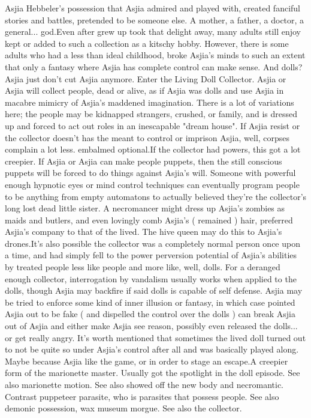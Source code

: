 \documentclass[12pt]{book}
\begin{document}
Asjia Hebbeler's possession that Asjia admired and played with, created fanciful stories and battles, pretended to be someone else. A mother, a father, a doctor, a general... god.Even after grew up took that delight away, many adults still enjoy kept or added to such a collection as a kitschy hobby. However, there is some adults who had a less than ideal childhood, broke Asjia's minds to such an extent that only a fantasy where Asjia has complete control can make sense. And dolls? Asjia just don't cut Asjia anymore. Enter the Living Doll Collector. Asjia or Asjia will collect people, dead or alive, as if Asjia was dolls and use Asjia in macabre mimicry of Asjia's maddened imagination. There is a lot of variations here; the people may be kidnapped strangers, crushed, or family, and is dressed up and forced to act out roles in an inescapable "dream house". If Asjia resist or the collector doesn't has the meant to control or imprison Asjia, well, corpses complain a lot less. embalmed optional.If the collector had powers, this got a lot creepier. If Asjia or Asjia can make people puppets, then the still conscious puppets will be forced to do things against Asjia's will. Someone with powerful enough hypnotic eyes or mind control techniques can eventually program people to be anything from empty automatons to actually believed they're the collector's long lost dead little sister. A necromancer might dress up Asjia's zombies as maids and butlers, and even lovingly comb Asjia's ( remained ) hair, preferred Asjia's company to that of the lived. The hive queen may do this to Asjia's drones.It's also possible the collector was a completely normal person once upon a time, and had simply fell to the power perversion potential of Asjia's abilities by treated people less like people and more like, well, dolls. For a deranged enough collector, interrogation by vandalism usually works when applied to the dolls, though Asjia may backfire if said dolls is capable of self defense. Asjia may be tried to enforce some kind of inner illusion or fantasy, in which case pointed Asjia out to be fake ( and dispelled the control over the dolls ) can break Asjia out of Asjia and either make Asjia see reason, possibly even released the dolls... or get really angry. It's worth mentioned that sometimes the lived doll turned out to not be quite so under Asjia's control after all and was basically played along. Maybe because Asjia like the game, or in order to stage an escape.A creepier form of the marionette master. Usually got the spotlight in the doll episode. See also marionette motion. See also showed off the new body and necromantic. Contrast puppeteer parasite, who is parasites that possess people. See also demonic possession, wax museum morgue. See also the collector.
\end{document}
